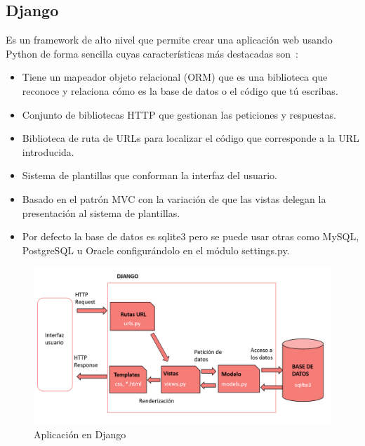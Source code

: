\documentclass[a4paper, 12pt]{book}
\begin{document}
\subsection{Django}
Es un framework de alto nivel que permite crear una aplicación web usando Python de forma sencilla cuyas características más destacadas son~\cite{bennett2009practical}:
\begin{itemize}
    \item Tiene un mapeador objeto relacional (ORM) que es una biblioteca que reconoce y relaciona cómo es la base de datos o el código que tú escribas.
    \item Conjunto de bibliotecas HTTP que gestionan las peticiones y respuestas.
    \item Biblioteca de ruta de URLs para localizar el código que corresponde a la URL introducida. 
    \item Sistema de plantillas que conforman la interfaz del usuario.
    \item Basado en el patrón MVC con la variación de que las vistas delegan la presentación al sistema de plantillas.
    \item Por defecto la base de datos es sqlite3 pero se puede usar otras como MySQL, PostgreSQL u Oracle configurándolo en el módulo settings.py.
   
\end{itemize}

\begin{figure}[h]
        \centering
        \includegraphics[scale=0.43]{img/django.png}
        \caption{Aplicación en Django }
        \label{figura:appDjango}
\end{figure}
\end{document}
